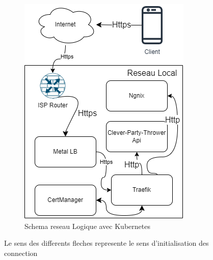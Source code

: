 \begin{figure}[H]
\begin{subfigure}[b]{0.45\textwidth}
        \includegraphics[width=\textwidth]{./images/shemaReseauKube.drawio}
        \caption{Schema reseau Logique avec Kubernetes}
        \label{fig:schemaKube}
    \end{subfigure}
    \caption{Le sens des differents fleches represente le sens d'initialisation des connection}
    \label{fig:schemaReseau}
\end{figure}